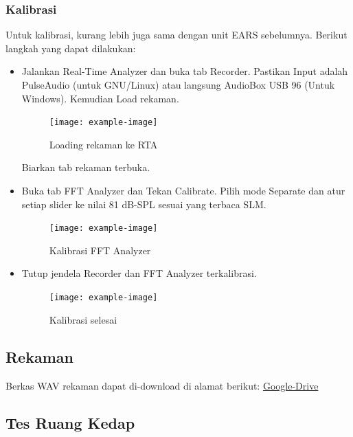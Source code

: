 \documentclass{article}
\begin{document}
	\subsubsection{Kalibrasi}
	
	Untuk kalibrasi, kurang lebih juga sama dengan unit EARS sebelumnya.
	Berikut langkah yang dapat dilakukan:
	
	\begin{itemize}
		\item Jalankan Real-Time Analyzer dan buka tab Recorder.
		Pastikan Input adalah PulseAudio (untuk GNU/Linux) atau langsung AudioBox USB 96 (Untuk Windows).
		Kemudian Load rekaman.
		
		\begin{figure}[H]
			\centering
			\texttt{[image: example-image]}
			\caption{Loading rekaman ke RTA}
		\end{figure}
		
		Biarkan tab rekaman terbuka.
		
		\item Buka tab FFT Analyzer dan Tekan Calibrate.
		Pilih mode Separate dan atur setiap slider ke nilai 81 dB-SPL sesuai yang terbaca SLM.
		
		\begin{figure}[H]
			\centering
			\texttt{[image: example-image]}
			\caption{Kalibrasi FFT Analyzer}
		\end{figure}
		
		\newpage
		\item Tutup jendela Recorder dan FFT Analyzer terkalibrasi.
		
		\begin{figure}[H]
			\centering
			\texttt{[image: example-image]}
			\caption{Kalibrasi selesai}
		\end{figure}
		
	\end{itemize}
	
	\newpage
	\subsection{Rekaman}
	
	Berkas WAV rekaman dapat di-download di alamat berikut: \href{https://drive.google.com/drive/folders/18bjBI3CSgyAX_4-f_cD2AvmgAtwJ-hkF}{Google-Drive}

	\subsection{Tes Ruang Kedap}
	
\end{document}
